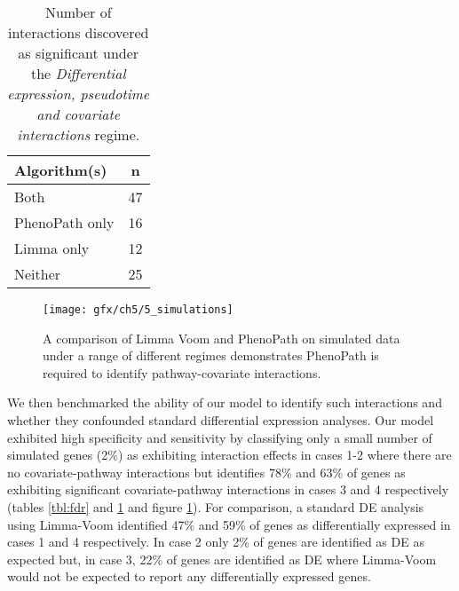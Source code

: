 \begin{table}[ht]
\centering
\begin{tabular}{|l | c|}
  \hline
  Algorithm(s) & n \\
  \hline
 Both &  47 \\
   PhenoPath only &  16 \\
   Limma only &  12 \\
   Neither &  25 \\
   \hline
\end{tabular} \caption{Number of interactions discovered as significant under the \emph{Differential expression, pseudotime and covariate interactions} regime.} \label{tbl:nclvm}
\end{table}


\begin{figure}
\centering
  \texttt{[image: gfx/ch5/5\_simulations]}
  \caption{A comparison of Limma Voom and PhenoPath on simulated data under a range of different regimes demonstrates PhenoPath is required to identify pathway-covariate interactions.
  } \label{fig:simulations}
\end{figure}

We then benchmarked the ability of our model to identify such interactions and whether they confounded standard differential expression analyses. Our model exhibited high specificity and sensitivity by classifying only a small number of simulated genes (2\%) as exhibiting interaction effects in cases 1-2 where there are no covariate-pathway interactions but identifies 78\% and 63\% of genes as exhibiting significant covariate-pathway interactions in cases 3 and 4 respectively (tables \ref{tbl:fdr} and \ref{tbl:nclvm} and figure \ref{fig:simulations}). For comparison, a standard DE analysis using Limma-Voom identified 47\% and 59\% of genes as differentially expressed in cases 1 and 4 respectively. In case 2 only 2\% of genes are identified as DE as expected but, in case 3, 22\% of genes are identified as DE where Limma-Voom would not be expected to report any differentially expressed genes.

